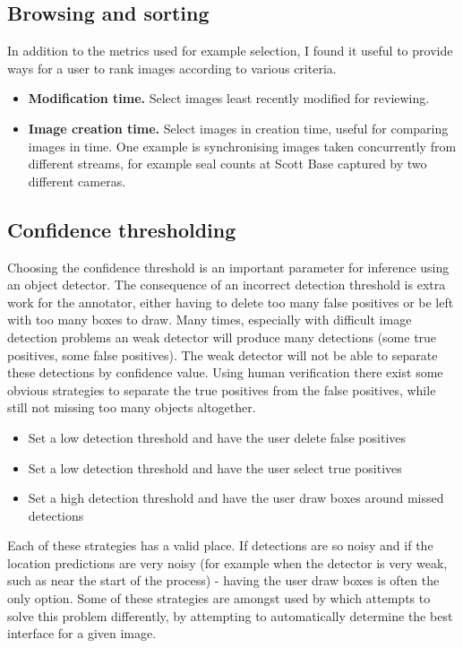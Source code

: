 \subsection {Browsing and sorting}


In addition to the metrics used for example selection, I found it useful to provide ways for a user to rank images according to various criteria.

\begin{itemize}
    \item {\bf Modification time.}
Select images least recently modified for reviewing.
    \item {\bf Image creation time. }
Select images in creation time, useful for comparing images in time. One example is synchronising images taken concurrently from different streams, for example seal counts at Scott Base captured by two different cameras.
\end{itemize}

\subsection {Confidence thresholding}

Choosing the confidence threshold is an important parameter for inference using an object detector. The consequence of an incorrect detection threshold is extra work for the annotator, either having to delete too many false positives or be left with too many boxes to draw. Many times, especially with difficult image detection problems an weak detector will produce many detections (some true positives, some false positives). The weak detector will not be able to separate these detections by confidence value. Using human verification there exist some obvious strategies to separate the true positives from the false positives, while still not missing too many objects altogether. 

\begin{itemize}
    \item Set a low detection threshold and have the user delete false positives
    \item Set a low detection threshold and have the user select true positives
    \item Set a high detection threshold and have the user draw boxes around missed detections
\end{itemize}

Each of these strategies has a valid place. If detections are so noisy and if the location predictions are very noisy (for example when the detector is very weak, such as near the start of the process) - having the user draw boxes is often the only option. Some of these strategies are amongst used by \cite{Konyushkova2017} which attempts to solve this problem differently, by attempting to automatically determine the best interface for a given image.

